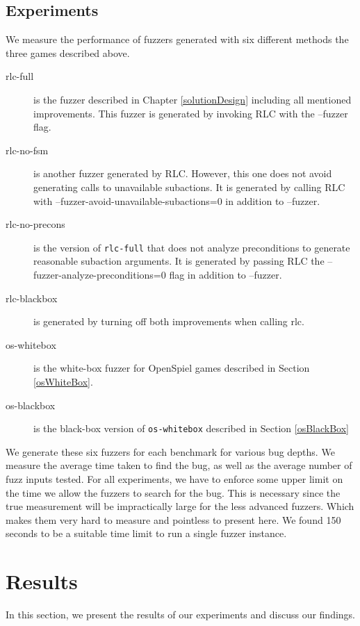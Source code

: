 \subsection{Experiments}
We measure the performance of fuzzers generated with six different methods the three games described above.
\begin{description}
    \item[rlc-full] is the fuzzer described in Chapter \ref{solutionDesign} including all mentioned improvements.
    This fuzzer is generated by invoking RLC with the --fuzzer flag.
    \item[rlc-no-fsm] is another fuzzer generated by RLC. However, this one does not avoid generating calls to unavailable subactions.
    It is generated by calling RLC with --fuzzer-avoid-unavailable-subactions=0 in addition to --fuzzer.
    \item[rlc-no-precons] is the version of \texttt{rlc-full} that does not analyze preconditions to generate reasonable subaction arguments.
    It is generated by passing RLC the --fuzzer-analyze-preconditions=0 flag in addition to --fuzzer.
    \item[rlc-blackbox] is generated by turning off both improvements when calling rlc.
    \item[os-whitebox] is the white-box fuzzer for OpenSpiel games described in Section \ref{osWhiteBox}.
    \item[os-blackbox] is the black-box version of \texttt{os-whitebox} described in Section \ref{osBlackBox}
\end{description}

We generate these six fuzzers for each benchmark for various bug depths.
We measure the average time taken to find the bug, as well as the average number of fuzz inputs tested.
For all experiments, we have to enforce some upper limit on the time we allow the fuzzers to search for the bug.
This is necessary since the true measurement will be impractically large for the less advanced fuzzers.
Which makes them very hard to measure and pointless to present here.
We found 150 seconds to be a suitable time limit to run a single fuzzer instance.

\section{Results}
In this section, we present the results of our experiments and discuss our findings.
